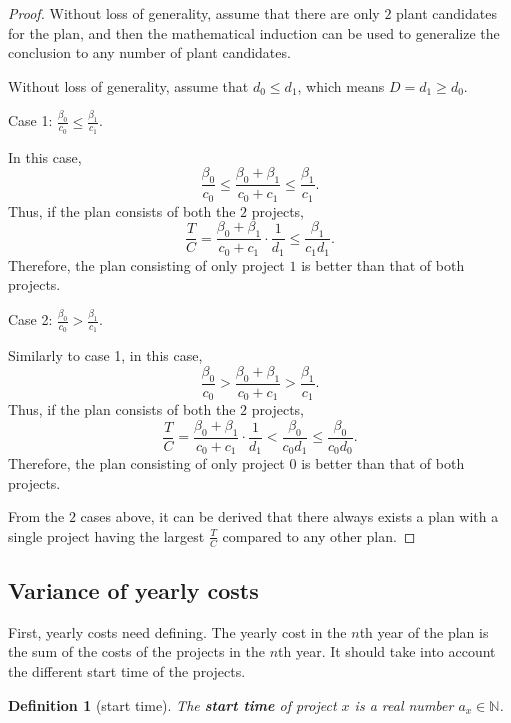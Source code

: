 \documentclass{article}
\newtheorem{definition}{Definition}
\begin{document}
\begin{proof}
Without loss of generality, assume that there are only $2$ plant candidates for the plan,
and then the mathematical induction can be used to generalize the conclusion to any number of plant candidates.

Without loss of generality, assume that $d_0\le d_1$, which means $D=d_1\ge d_0$.

Case 1: $\frac{\beta_0}{c_0}\le\frac{\beta_1}{c_1}$.

In this case,
\begin{equation*}
\frac{\beta_0}{c_0}\le\frac{\beta_0+\beta_1}{c_0+c_1}\le\frac{\beta_1}{c_1}.
\end{equation*}
Thus, if the plan consists of both the $2$ projects,
\begin{equation*}
\frac TC=\frac{\beta_0+\beta_1}{c_0+c_1}\cdot\frac1{d_1}\le\frac{\beta_1}{c_1d_1}.
\end{equation*}
Therefore, the plan consisting of only project $1$ is better than that of both projects.

Case 2: $\frac{\beta_0}{c_0}>\frac{\beta_1}{c_1}$.

Similarly to case 1, in this case,
\begin{equation*}
\frac{\beta_0}{c_0}>\frac{\beta_0+\beta_1}{c_0+c_1}>\frac{\beta_1}{c_1}.
\end{equation*}
Thus, if the plan consists of both the $2$ projects,
\begin{equation*}
\frac TC=\frac{\beta_0+\beta_1}{c_0+c_1}\cdot\frac1{d_1}<\frac{\beta_0}{c_0d_1}\le\frac{\beta_0}{c_0d_0}.
\end{equation*}
Therefore, the plan consisting of only project $0$ is better than that of both projects.

From the $2$ cases above, it can be derived that there always exists a plan with a single project having the largest $\frac TC$ compared to any other plan.
\end{proof}

\subsection{Variance of yearly costs}
\label{sec:variance of yearly costs}

First, yearly costs need defining.
The yearly cost in the $n$th year of the plan is the sum of the costs of the projects in the $n$th year.
It should take into account the different start time of the projects.

\begin{definition}[start time]
The \textbf{start time} of project $x$ is a real number $a_x\in\mathbb N$.
\end{definition}
\end{document}
